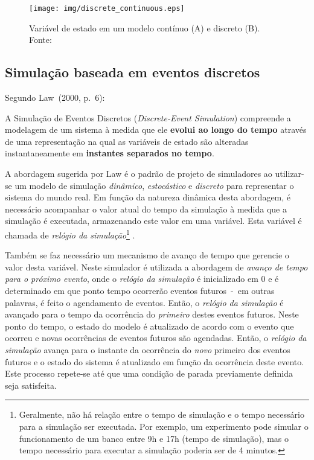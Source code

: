 \begin{enumerate}
\begin{figure}[htb!]
\centering\texttt{[image: img/discrete\_continuous.eps]}
\caption[Variável de estado em um modelo contínuo e discreto.]{\label{fig:disccont}Variável de estado em um modelo contínuo (A) e discreto (B). Fonte:~\cite{Banks}}
\end{figure}

\end{enumerate}

\subsection{\label{simulator:movation:discrete}Simulação baseada em eventos discretos}

Segundo Law~(2000, p.~6):

\begin{directcite}
A Simulação de Eventos Discretos (\textit{Discrete-Event Simulation}) compreende
a modelagem de um sistema à medida que ele \textbf{evolui ao longo do tempo}
através de uma representação na qual as variáveis de estado são alteradas
instantaneamente em \textbf{instantes separados no tempo}.
\end{directcite}

A abordagem sugerida por Law é o padrão de projeto de simuladores ao utilizar-se
um modelo de simulação \textit{dinâmico}, \textit{estocástico} e
\textit{discreto} para representar o sistema do mundo real. Em função da
natureza dinâmica desta abordagem, é necessário acompanhar o valor atual do
tempo da simulação à medida que a simulação é executada, armazenando este valor
em uma variável. Esta variável é chamada de \textit{relógio da
simulação}\footnote{Geralmente, não há relação entre o tempo de simulação e o
tempo necessário para a simulação ser executada. Por exemplo, um experimento
pode simular o funcionamento de um banco entre 9h e 17h (tempo de simulação),
mas o tempo necessário para executar a simulação poderia ser de 4 minutos.}
\cite{Law}.

Também se faz necessário um mecanismo de avanço de tempo que gerencie o valor
desta variável. Neste simulador é utilizada a abordagem de \textit{avanço de
tempo para o próximo evento}, onde o \textit{relógio da simulação} é
inicializado em 0 e é determinado em que ponto tempo ocorrerão eventos
futuros~-~em outras palavras, é feito o agendamento de eventos. Então, o
\textit{relógio da simulação} é avançado para o tempo da ocorrência do
\textit{primeiro} destes eventos futuros. Neste ponto do tempo, o estado do
modelo é atualizado de acordo com o evento que ocorreu e novas ocorrências de
eventos futuros são agendadas. Então, o \textit{relógio da simulação} avança
para o instante da ocorrência do \textit{novo} primeiro dos eventos futuros e o
estado do sistema é atualizado em função da ocorrência deste evento. Este
processo repete-se até que uma condição de parada previamente definida seja
satisfeita.

